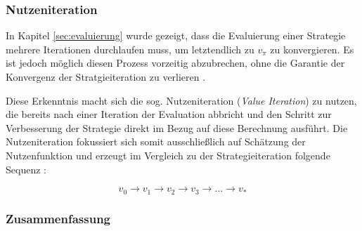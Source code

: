 \subsubsection{Nutzeniteration}\label{sec:Nutzeniteration}
In Kapitel \ref{sec:evaluierung} wurde gezeigt, dass die Evaluierung einer Strategie mehrere Iterationen durchlaufen muss, um letztendlich zu $v_\pi$ zu konvergieren. Es ist jedoch möglich diesen Prozess vorzeitig abzubrechen, \glqq ohne die Garantie der Konvergenz der Stratgieiteration zu verlieren\grqq{} \cite[S.~82]{Sutton1998}. 
\par 
Diese Erkenntnis macht sich die sog. Nutzeniteration (\textit{Value Iteration}) zu nutzen, die bereits nach einer Iteration der Evaluation abbricht und den Schritt zur Verbesserung der Strategie direkt im Bezug auf diese Berechnung ausführt. Die Nutzeniteration fokussiert sich somit ausschließlich auf Schätzung der Nutzenfunktion und erzeugt im Vergleich zu der Strategieiteration folgende Sequenz \cite[S.~23]{Wiering}:

\begin{equation}\label{eq:valueItSeq}
    v_0 \rightarrow v_1 \rightarrow v_2 \rightarrow v_3 \rightarrow \dots \rightarrow v_*
\end{equation}

\subsubsection{Zusammenfassung}
